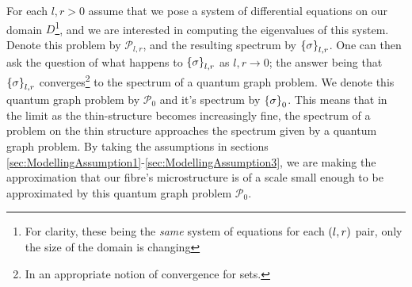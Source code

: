 For each $l,r>0$ assume that we pose a system of differential equations on our domain $D$\footnote{For clarity, these being the \textit{same} system of equations for each $\left( l,r \right)$ pair, only the size of the domain is changing}, and we are interested in computing the eigenvalues of this system.
Denote this problem by $\mathcal{P}_{l,r}$, and the resulting spectrum by $\left\{ \sigma \right\}_{l,r}$.
One can then ask the question of what happens to $\left\{ \sigma \right\}_{l,r}$ as $l,r\rightarrow0$; the answer being that $\left\{ \sigma \right\}_{l,r}$ converges\footnote{In an appropriate notion of convergence for sets.} to the spectrum of a quantum graph problem.
We denote this quantum graph problem by $\mathcal{P}_0$ and it's spectrum by $\left\{ \sigma \right\}_0$.
This means that in the limit as the thin-structure becomes increasingly fine, the spectrum of a problem on the thin structure approaches the spectrum given by a quantum graph problem.
By taking the assumptions in sections \ref{sec:ModellingAssumption1}-\ref{sec:ModellingAssumption3}, we are making the approximation that our fibre's microstructure is of a scale small enough to be approximated by this quantum graph problem $\mathcal{P}_0$. \newline

